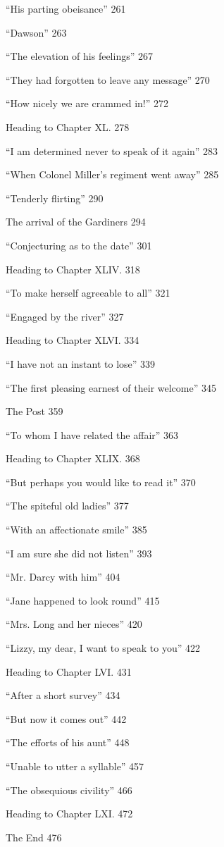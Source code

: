 \documentclass[11pt, statementpaper, twoside, openright]{memoir}
\begin{document}
``His parting obeisance'' 261

``Dawson'' 263

``The elevation of his feelings'' 267

``They had forgotten to leave any message'' 270

``How nicely we are crammed in!'' 272

Heading to Chapter XL. 278

``I am determined never to speak of it again'' 283

``When Colonel Miller's regiment went away'' 285

``Tenderly flirting'' 290

The arrival of the Gardiners 294

``Conjecturing as to the date'' 301

Heading to Chapter XLIV. 318

``To make herself agreeable to all'' 321

``Engaged by the river'' 327

Heading to Chapter XLVI. 334

``I have not an instant to lose'' 339

``The first pleasing earnest of their welcome'' 345

The Post 359

``To whom I have related the affair'' 363

Heading to Chapter XLIX. 368

``But perhaps you would like to read it'' 370

``The spiteful old ladies'' 377

``With an affectionate smile'' 385

``I am sure she did not listen'' 393

``Mr. Darcy with him'' 404

``Jane happened to look round'' 415

``Mrs. Long and her nieces'' 420

``Lizzy, my dear, I want to speak to you'' 422

Heading to Chapter LVI. 431

``After a short survey'' 434

``But now it comes out'' 442

``The efforts of his aunt'' 448

``Unable to utter a syllable'' 457

``The obsequious civility'' 466

Heading to Chapter LXI. 472

The End 476


\mainmatter

\end{document}
